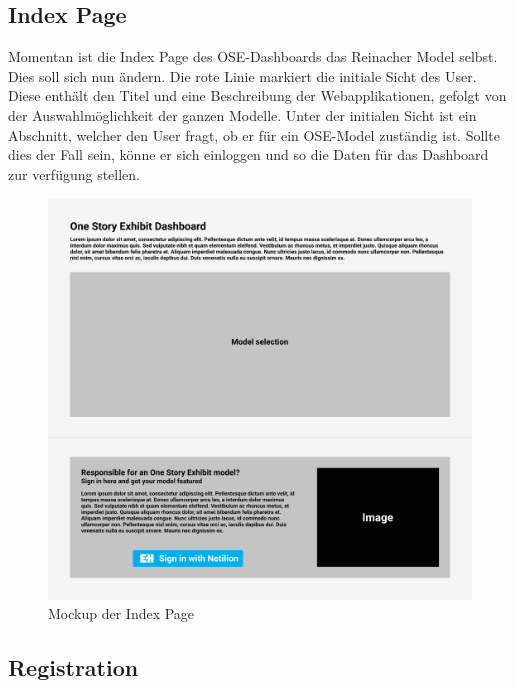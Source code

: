 \subsection{Index Page} \label{mck:index} 
Momentan ist die Index Page des OSE-Dashboards das Reinacher Model selbst. Dies soll sich nun ändern. Die rote Linie markiert die initiale Sicht des User. Diese enthält den Titel und eine Beschreibung der Webapplikationen, gefolgt von der Auswahlmöglichkeit der ganzen Modelle. Unter der initialen Sicht ist ein Abschnitt, welcher den User fragt, ob er für ein OSE-Model zuständig ist. Sollte dies der Fall sein, könne er sich einloggen und so die Daten für das Dashboard zur verfügung stellen.
\begin{figure}[H]
  \centering
  \includegraphics[width=\textwidth]{./mockups/index/not_signed_in.pdf}
  \caption[{Mockup der Index Page}]{Mockup der Index Page}
  \label{fig:mck-index}
\end{figure}
\pagebreak
\subsection{Registration} \label{mck:registration}
